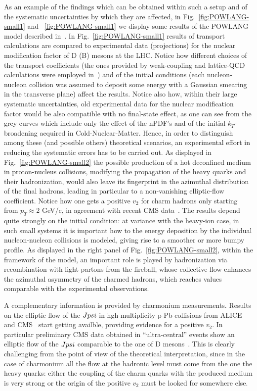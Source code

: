 As an example of the findings which can be obtained within such a setup and of the systematic uncertainties by which they are affected, in Fig.~\ref{fig:POWLANG-small1} and ~\ref{fig:POWLANG-small1} we display some results of the POWLANG model described in~\cite{Beraudo:2015wsd}.
In Fig.~\ref{fig:POWLANG-small1} results of transport calculations are compared to experimental data (projections) for the nuclear modification factor of D (B) mesons at the LHC. Notice how different choices of the transport coefficients (the ones provided by weak-coupling and lattice-QCD calculations were employed in~\cite{Beraudo:2015wsd}) and of the initial conditions (each nucleon-nucleon collision was assumed to deposit some energy with a Gaussian smearing in the transverse plane) affect the results. Notice also how, within their large systematic uncertainties, old experimental data for the nuclear modification factor would be also compatible with no final-state effect, as one can see from the grey curves which include only the effect of the nPDF's and of the initial $k_T$-broadening acquired in Cold-Nuclear-Matter. Hence, in order to distinguish among these (and possible others) theoretical scenarios, an experimental effort in reducing the systematic errors has to be carried out.
As displayed in Fig.~\ref{fig:POWLANG-small2} the possible production of a hot deconfined medium in proton-nucleus collisions, modifying the propagation of the heavy quarks and their hadronization, would also leave its fingerprint in the azimuthal distribution of the final hadrons, leading in particular to a non-vanishing elliptic-flow coefficient. Notice how one gets a positive $v_2$ for charm hadrons only starting from $p_T\!\approx\!2$ GeV/c, in agreement with recent CMS data~\cite{Sirunyan:2018toe}. The results depend quite strongly on the initial condition: at variance with the heavy-ion case, in such small systems it is important how to the energy deposition by the individual nucleon-nucleon collisions is modeled, giving rise to a smoother or more bumpy profile. As displayed in the right panel of Fig.~\ref{fig:POWLANG-small2}, within the framework of the model, an important role is played by hadronization via recombination with light partons from the fireball, whose collective flow enhances the azimuthal asymmetry of the charmed hadrons, which reaches values comparable with the experimental observations.

A complementary information is provided by charmonium measurements. Results on the elliptic flow of the $J\/psi$ in hgh-multiplicity p-Pb collisions from ALICE~\cite{Acharya:2017tfn} and CMS~\cite{CMS:2018xac} start getting availble, providing evidence for a positive $v_2$. In particular preliminary CMS data obtained in ``ultra-central'' events show an elliptic flow of the $J\/psi$ comparable to the one of D mesons~\cite{CMS:2018xac}. This is clearly challenging from the point of view of the theoretical interpretation, since in the case of charmonium all the flow at the hadronic level must come from the one the heavy quarks: either the coupling of the charm quarks with the produced medium is very strong or the origin of the positive $v_2$ must be looked for somewhere else.


